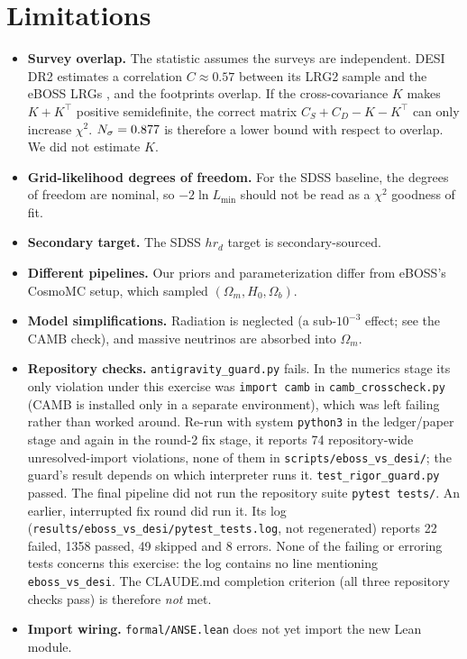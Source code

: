 \documentclass[11pt]{article}
\begin{document}
\section{Limitations}
\begin{itemize}
\item \textbf{Survey overlap.} The statistic assumes the surveys are
  independent. DESI DR2 estimates a correlation $C\approx0.57$ between its
  LRG2 sample and the eBOSS LRGs \cite{desi2025dr2}, and the footprints
  overlap. If the cross-covariance $K$ makes $K+K^\top$ positive
  semidefinite, the correct matrix $C_S+C_D-K-K^\top$ can only increase
  $\chi^2$. $N_\sigma=0.877$ is therefore a lower bound with respect to
  overlap. We did not estimate $K$.
\item \textbf{Grid-likelihood degrees of freedom.} For the SDSS baseline,
  the degrees of freedom are nominal, so $-2\ln L_\mathrm{min}$ should not
  be read as a $\chi^2$ goodness of fit.
\item \textbf{Secondary target.} The SDSS $h r_d$ target is
  secondary-sourced.
\item \textbf{Different pipelines.} Our priors and parameterization differ
  from eBOSS's CosmoMC setup, which sampled $(\Omega_m, H_0, \Omega_b)$.
\item \textbf{Model simplifications.} Radiation is neglected (a sub-$10^{-3}$
  effect; see the CAMB check), and massive neutrinos are absorbed into
  $\Omega_m$.
\item \textbf{Repository checks.} \texttt{antigravity\_guard.py} fails. In
  the numerics stage its only violation under this exercise was
  \texttt{import camb} in \texttt{camb\_crosscheck.py} (CAMB is installed
  only in a separate environment), which was left failing rather than worked
  around. Re-run with system \texttt{python3} in the ledger/paper stage and
  again in the round-2 fix stage, it
  reports 74 repository-wide unresolved-import violations, none of them in
  \texttt{scripts/eboss\_vs\_desi/}; the guard's result depends on which
  interpreter runs it.
  \texttt{test\_rigor\_guard.py} passed. The final pipeline did not run the
  repository suite \texttt{pytest tests/}. An earlier, interrupted fix round
  did run it. Its log (\texttt{results/eboss\_vs\_desi/pytest\_tests.log},
  not regenerated) reports 22 failed, 1358 passed, 49 skipped and 8 errors.
  None of the failing or erroring tests concerns this exercise: the log
  contains no line mentioning \texttt{eboss\_vs\_desi}. The CLAUDE.md
  completion criterion (all three repository checks pass) is therefore
  \emph{not} met.
\item \textbf{Import wiring.} \texttt{formal/ANSE.lean} does not yet import
  the new Lean module.
\end{itemize}
\end{document}
